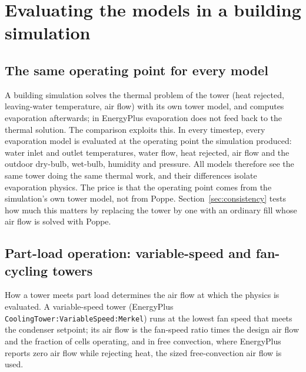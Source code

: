 \documentclass[preprint,12pt]{elsarticle}
\begin{document}
\section{Evaluating the models in a building simulation}\label{sec:evaluation}
\subsection{The same operating point for every model}\label{sec:samepoint}
A building simulation solves the thermal problem of the tower (heat rejected, leaving-water temperature, air flow) with
its own tower model, and computes evaporation afterwards; in EnergyPlus evaporation does not feed back to the thermal
solution. The comparison exploits this. In every timestep, every evaporation model is evaluated at
the operating point the simulation produced: water inlet and outlet temperatures, water flow, heat rejected, air flow
and the outdoor dry-bulb, wet-bulb, humidity and pressure. All models therefore see the same tower doing the same
thermal work, and their differences isolate evaporation physics. The price is that the operating point comes from the
simulation's own tower model, not from Poppe. Section~\ref{sec:consistency} tests how much this matters by replacing
the tower by one with an ordinary fill whose air flow is solved with Poppe.

\subsection{Part-load operation: variable-speed and fan-cycling towers}\label{sec:states}
How a tower meets part load determines the air flow at which the physics is evaluated. A variable-speed tower
(EnergyPlus \texttt{CoolingTower:VariableSpeed:Merkel}) runs at the lowest fan speed that meets the condenser setpoint;
its air flow is the fan-speed ratio times the design air flow and the fraction of cells operating, and in free
convection, where EnergyPlus reports zero air flow while rejecting heat, the sized free-convection air flow is used.
\end{document}
